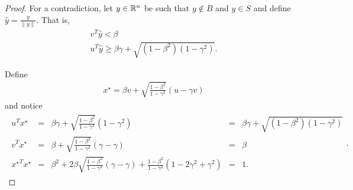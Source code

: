 \begin{proof}

For a contradiction, let $y \in \mathbb R^n$ be such that $y \not \in B$ and $y \in S$ and define $\hat y = \frac{y}{\|y\|}$.
That is,
\begin{align}
v^T\hat y < \beta \label{csc_vy} \\
u^T\hat y \ge \beta\gamma + \sqrt{\left(1 - \beta^2\right)\left(1 - \gamma^2\right)}. \label{csc_uy}
\end{align}

Define
\begin{align*}
x^{\star} = \beta v + \sqrt{\frac{1 - \beta^2}{1 - \gamma^2}} (u - \gamma v )
\end{align*} and notice
\begin{align}
\begin{array}{ccccc}
{u}^Tx^{\star} &=& \beta\gamma + \sqrt{\frac{1 - \beta^2}{1 - \gamma^2}} (1 - \gamma^2) &=&  \beta\gamma + \sqrt{\left(1 - \beta^2\right)\left(1 - \gamma^2\right)} \\
{v}^Tx^{\star} &=& \beta + \sqrt{\frac{1 - \beta^2}{1 - \gamma^2}}(\gamma - \gamma) &=& \beta \\
{x^{\star}}^Tx^{\star} &=& \beta^2 + 2\beta\sqrt{\frac{1 - \beta^2}{1 - \gamma^2}}(\gamma - \gamma) + \frac{1 - \beta^2}{1 - \gamma^2} (1- 2\gamma^2 + \gamma^2)&=& 1.
\end{array}. \label{csc_vx_ux}
\end{align}


\end{proof}
